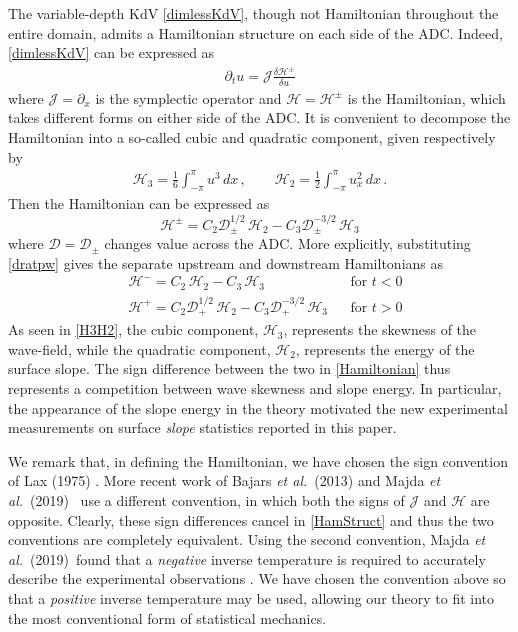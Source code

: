 \documentclass[11pt]{article}
\newcommand{\pdi}[2] { {\partial_#2} #1 }
\newcommand{\dx}{\, dx}
\newcommand{\drat}{\mathcal{D}}
\newcommand{\dratdn}{\drat_+}
\newcommand{\dratupdn}{\drat_{\pm}}
\newcommand{\sympJ}{\mathcal{J}}
\newcommand{\vard}[2]{\frac{\delta #1}{\delta #2}}
\newcommand{\Ham}{\mathcal{H}}
\newcommand{\Hup}{\Ham^{-}}
\newcommand{\Hdn}{\Ham^{+}}
\newcommand{\Hupdn}{\Ham^{\pm}}
\newcommand{\Hthree}{\Ham_{3}}
\newcommand{\Htwo}{\Ham_{2}}
\newcommand{\maetal}{Majda {\it et al.}~(2019)~}
\begin{document}
The variable-depth KdV \eqref{dimlessKdV}, though not Hamiltonian throughout the entire domain, admits a Hamiltonian structure on each side of the ADC. Indeed, \eqref{dimlessKdV} can be expressed as
\begin{align}
\label{HamStruct}
\partial_t{u} = \sympJ \vard{\Hupdn}{u}
\end{align}
where $\sympJ = \pdi{}{x}$ is the symplectic operator and $\Ham = \Hupdn$ is the Hamiltonian, which takes different forms on either side of the ADC. It is convenient to decompose the Hamiltonian into a so-called cubic and quadratic component, given respectively by
\begin{align}
\label{H3H2}
\Hthree = \frac{1}{6} \int_{-\pi}^{\pi} u^3 \dx	\, , \qquad
\Htwo = \frac{1}{2} \int_{-\pi}^{\pi} u_x^2 \dx	\, .
\end{align}
Then the Hamiltonian can be expressed as
\begin{equation}
\label{Hamiltonian}
\Hupdn = C_2 \dratupdn^{1/2} \, \Htwo - C_3 \dratupdn^{-3/2} \, \Hthree
\end{equation}
where $\drat = \dratupdn$ changes value across the ADC. More explicitly, substituting \eqref{dratpw} gives the separate upstream and downstream Hamiltonians as
\begin{align}
&\Hup = C_2 \, \Htwo - C_3 \, \Hthree 						&& \text{for } t<0 \\
&\Hdn = C_2 \dratdn^{1/2} \, \Htwo - C_3 \dratdn^{-3/2} \, \Hthree	&& \text{for } t>0
\end{align}
As seen in \eqref{H3H2}, the cubic component, $\Hthree$, represents the skewness of the wave-field, while the quadratic component, $\Htwo$, represents the energy of the surface slope. The sign difference between the two in \eqref{Hamiltonian} thus represents a competition between wave skewness and slope energy. In particular, the appearance of the slope energy in the theory motivated the new experimental measurements on surface {\em slope} statistics reported in this paper. 

We remark that, in defining the Hamiltonian, we have chosen the sign convention of Lax (1975) \cite{lax1975periodic}. More recent work of Bajars {\it et al.}~(2013) \cite{bajars2013weakly} and \maetal \cite{majda2019} use a different convention, in which both the signs of $\sympJ$ and $\Ham$ are opposite. Clearly, these sign differences cancel in \eqref{HamStruct} and thus the two conventions are completely equivalent. Using the second convention, \maetal found that a {\em negative} inverse temperature is required to accurately describe the experimental observations \cite{majda2019}. We have  chosen the convention above so that a {\em positive} inverse temperature may be used, allowing our theory to fit into the most conventional form of statistical mechanics.
\end{document}
